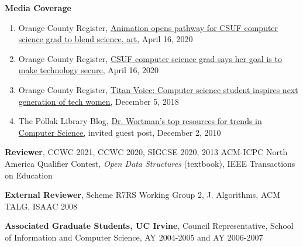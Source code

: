 \documentclass[11pt]{letter}
\begin{document}
\textbf{Media Coverage}
\begin{enumerate}
\item Orange County Register, \href{https://www.ocregister.com/2020/04/16/animation-opens-pathway-for-csuf-computer-science-grad-to-blend-science-and-art/}{Animation opens pathway for CSUF computer science grad to blend science, art}, April 16, 2020
\item Orange County Register, \href{https://www.ocregister.com/2020/04/16/csuf-computer-science-grad-says-her-goal-is-to-make-technology-secure/}{CSUF computer science grad says her goal is to make technology secure}, April 16, 2020
\item Orange County Register, \href{https://www.ocregister.com/2018/12/05/titan-voice-computer-science-student-inspires-next-generation-of-tech-women/}{Titan Voice: Computer science student inspires next generation of tech women,} December 5, 2018
\item The Pollak Library Blog, \href{http://libphp2006.fullerton.edu/blogs/news/2010/12/02/dr-wortmans-top-resources-for-trends-in-computer-science/}{Dr. Wortman's top resources for trends in Computer Science,} invited guest post, December 2, 2010
\end{enumerate}

\textbf{Reviewer}, CCWC 2021, CCWC 2020, SIGCSE 2020, 2013 ACM-ICPC North America Qualifier Contest, \emph{Open Data Structures} (textbook), IEEE Transactions on Education

\textbf{External Reviewer}, Scheme R7RS Working Group 2, J. Algorithms, ACM TALG, ISAAC 2008



\textbf{Associated Graduate Students, UC Irvine},  Council Representative, School of Information and Computer Science, AY 2004-2005 and AY 2006-2007 
\end{document}
